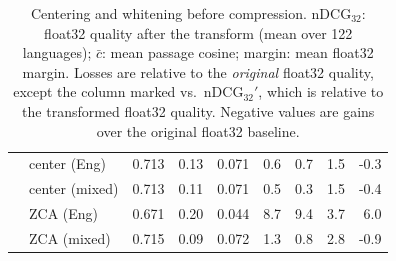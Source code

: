 \begin{table}[t]
\begin{tabular}{llrrrrrrr}
 & center (Eng) & 0.713 & 0.13 & 0.071 & 0.6 & 0.7 & 1.5 & -0.3 \\
 & center (mixed) & 0.713 & 0.11 & 0.071 & 0.5 & 0.3 & 1.5 & -0.4 \\
 & ZCA (Eng) & 0.671 & 0.20 & 0.044 & 8.7 & 9.4 & 3.7 & 6.0 \\
 & ZCA (mixed) & 0.715 & 0.09 & 0.072 & 1.3 & 0.8 & 2.8 & -0.9 \\
\bottomrule
\end{tabular}
\caption{Centering and whitening before compression. nDCG$_{32}$: float32 quality after the transform (mean over 122 languages); $\bar{c}$: mean passage cosine; margin: mean float32 margin. Losses are relative to the \emph{original} float32 quality, except the column marked vs.\ nDCG$_{32}'$, which is relative to the transformed float32 quality. Negative values are gains over the original float32 baseline.}\label{tab:whiten}
\end{table}